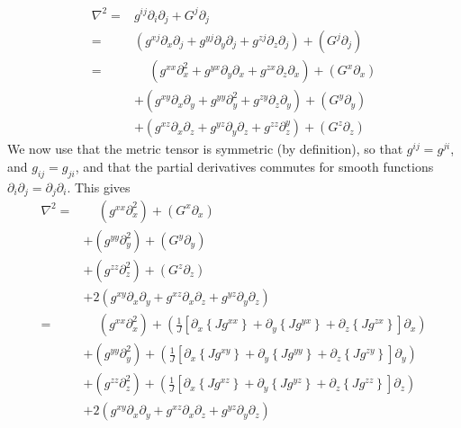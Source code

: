 \documentclass[12pt]{article}
\def\L{\left}
\def\R{\right}
\newcommand{\Grad}{\ensuremath{\nabla}}
\begin{document}
\begin{align*}
    \Grad^2 =& g^{ij} \partial_i \partial_j + G^j \partial_j\\
%
            =& \L(  g^{xj} \partial_x \partial_j
                  + g^{yj} \partial_y \partial_j
                  + g^{zj} \partial_z \partial_j\R)
               + \L(G^j \partial_j\R)\\
%
            =& \quad \,
               \L(  g^{xx} \partial_x^2
                  + g^{yx} \partial_y \partial_x
                  + g^{zx} \partial_z \partial_x\R)
               + \L(G^x \partial_x\R)\\
            &+ \L(  g^{xy} \partial_x \partial_y
                  + g^{yy} \partial_y^2
                  + g^{zy} \partial_z \partial_y\R)
               + \L(G^y \partial_y\R)\\
            &+ \L(  g^{xz} \partial_x \partial_z
                  + g^{yz} \partial_y \partial_z
                  + g^{zz} \partial_z^y\R)
               + \L(G^z \partial_z\R)
\end{align*}
%
We now use that the metric tensor is symmetric (by definition), so that
$g^{ij}=g^{ji}$, and $g_{ij}=g_{ji}$, and that the partial derivatives
commutes for smooth functions $\partial_i\partial_j=\partial_j\partial_i$.
This gives
%
\begin{align*}
    \Grad^2 =&\quad \,
               \L(g^{xx} \partial_x^2 \R)
               + \L(G^x \partial_x\R)\\
            &+ \L(g^{yy} \partial_y^2 \R)
               + \L(G^y \partial_y\R)\\
            &+ \L(g^{zz} \partial_z^2\R)
               + \L(G^z \partial_z\R)\\
            &+ 2\L( g^{xy} \partial_x \partial_y
                  + g^{xz} \partial_x \partial_z
                  + g^{yz} \partial_y \partial_z
                  \R)\\
%
	   =&\quad \,
               \L(g^{xx} \partial_x^2\R)
               + \L(
                    \frac{1}{J} \L[
                      \partial_x \L\{J g^{xx} \R\}
                    + \partial_y \L\{J g^{yx} \R\}
                    + \partial_z \L\{J g^{zx} \R\}
                    \R]
                    \partial_x\R)\\
            &+ \L(g^{yy} \partial_y^2\R)
               + \L(
                    \frac{1}{J} \L[
                      \partial_x \L\{J g^{xy} \R\}
                    + \partial_y \L\{J g^{yy} \R\}
                    + \partial_z \L\{J g^{zy} \R\}
                    \R]
                    \partial_y\R)\\
            &+ \L(g^{zz} \partial_z^2\R)
               + \L(
                    \frac{1}{J} \L[
                      \partial_x \L\{J g^{xz} \R\}
                    + \partial_y \L\{J g^{yz} \R\}
                    + \partial_z \L\{J g^{zz} \R\}
                    \R]
                    \partial_z\R)\\
            &+ 2\L( g^{xy} \partial_x \partial_y
                  + g^{xz} \partial_x \partial_z
                  + g^{yz} \partial_y \partial_z
                  \R)
\end{align*}
\end{document}

